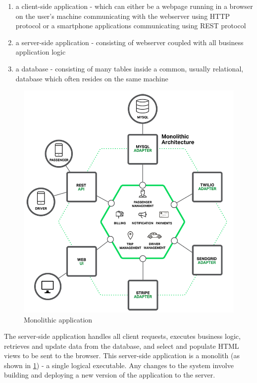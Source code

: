 \documentclass[12pt,oneside]{fithesis2}
\begin{document}
\begin{enumerate}
   \item a client-side application - which can either be a webpage running in a  browser on the user's machine communicating with the webserver using HTTP  protocol or a smartphone applications communicating using REST protocol
   \item a server-side application - consisting of webserver coupled with all business application logic
   \item a database - consisting of many tables inside a common, usually relational, database which often resides on the same machine
\end{enumerate}

\begin{figure}[ht!]
	\centering
	\includegraphics[width=\textwidth]{images/monolithic_application2.png}
	\caption{Monolithic application\footnotemark}
	\label{monolithic_application}
\end{figure}


The server-side application handles all client requests, executes business logic, retrieves and update data from the database, and select and populate HTML views to be sent to the browser. This server-side application is a monolith (as shown in \ref{monolithic_application}) - a single logical executable. Any changes to the system involve building and deploying a new version of the application to the server. \cite{mf}
\end{document}
